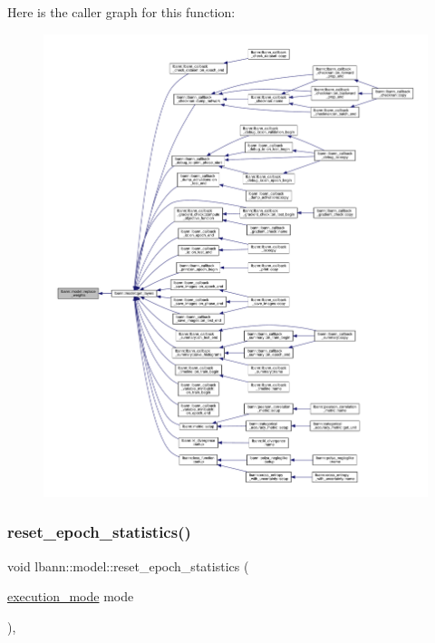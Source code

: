 Here is the caller graph for this function\+:\nopagebreak
\begin{figure}[H]
\begin{center}
\leavevmode
\includegraphics[width=350pt]{classlbann_1_1model_aaed20219476dc1458bbd058be36de1ec_icgraph}
\end{center}
\end{figure}
\mbox{\label{classlbann_1_1model_a9c6e9c199ca0ae06b8cf7266971ab9c3}} 
\subsubsection{\texorpdfstring{reset\+\_\+epoch\+\_\+statistics()}{reset\_epoch\_statistics()}}
{\footnotesize\ttfamily void lbann\+::model\+::reset\+\_\+epoch\+\_\+statistics (\begin{DoxyParamCaption}\item[{\hyperlink{base_8hpp_a2781a159088df64ed7d47cc91c4dc0a8}{execution\+\_\+mode}}]{mode }\end{DoxyParamCaption})\hspace{0.3cm}{\ttfamily [protected]}, {\ttfamily [virtual]}}

